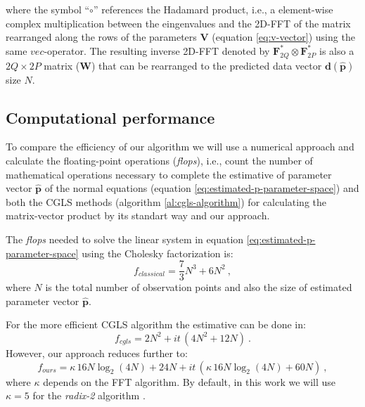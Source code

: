 where the symbol ``$\circ$'' references the Hadamard product, i.e., a element-wise complex multiplication between the eingenvalues and the 2D-FFT of the matrix rearranged along the rows of the parameters $\mathbf{V}$ (equation \ref{eq:v-vector}) using the same $vec$-operator. The resulting inverse 2D-FFT denoted by $\mathbf{F}_{2Q}^{\ast}  \otimes \mathbf{F}_{2P}^{\ast}$ is also a $2Q \times 2P$ matrix ($\mathbf{W}$) that can be rearranged to the predicted data vector $\mathbf{d}(\hat{\mathbf{p}})$ size $N$.

\subsection{Computational performance}

To compare the efficiency of our algorithm we will use a numerical approach and calculate the floating-point operations (\emph{flops}), i.e., count the number of mathematical operations necessary to complete the estimative of parameter vector $\mathbf{\hat{p}}$ of the normal equations (equation \ref{eq:estimated-p-parameter-space}) and both the CGLS methods (algorithm \ref{al:cgls-algorithm}) for calculating the matrix-vector product by its standart way and our approach.

The \emph{flops} needed to solve the linear system in equation \ref{eq:estimated-p-parameter-space} using the Cholesky factorization is:
\begin{equation}
f_{classical} =  \dfrac{7}{3} N^{3} + 6 N^{2}\: ,
\label{eq:flops-normal-cholesky}
\end{equation}
where $N$ is the total number of observation points and also the size of estimated parameter vector $\mathbf{\hat{p}}$.

For the more efficient CGLS algorithm the estimative can be done in:
\begin{equation}
f_{cgls} =  2 N^{2} + it \, (4 N^{2} + 12 N) \: .
\label{eq:flops-cgls}
\end{equation}
However, our approach reduces further to:
\begin{equation}
f_{ours} =  \kappa  \, 16 N \log_2(4 N) + 24 N + it \, (\kappa  \, 16 N \log_2 (4 N) + 60 N) \: ,
\label{eq:flops-cgls-bccb}
\end{equation}
where $\kappa$ depends on the FFT algorithm. By default, in this work we will use $\kappa = 5$ for the \emph{radix-2} algorithm \citep{vanloan1992}.

